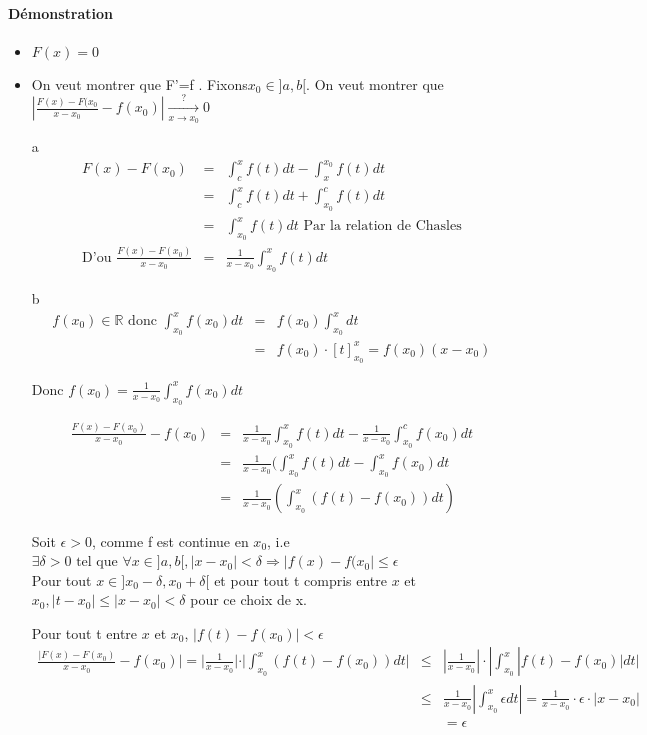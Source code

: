 \paragraph{Démonstration} 
\begin{itemize}
	\item $F(x) = 0$
	\item On veut montrer que F'=f . Fixons$x_0 \in ]a, b[$. On veut montrer que $|\frac{F(x) - F(x_0}{x-x_0} - f(x_0)| \xrightarrow[x \to x_0]{?} 0$ ~\\

	\item[a] \[\begin{array}{rclr}F(x) - F(x_0) &=& \int_c^x f(t)dt - \int_x^{x_0} f(t)dt \\
&=& \int_c^x f(t)dt + \int_{x_0}^c f(t)dt \\
&=& \int_{x_0}^x f(t)dt \text{ Par la relation de Chasles} \\
\text{D'ou } \frac{F(x)-F(x_0)}{x-x_0} &=& \frac{1}{x-x_0} \int_{x_0}^x f(t)dt \end{array}\]

	\item[b] \[\begin{array}{rcl}
				f(x_0) \in \mathbb{R} \text{ donc } \int_{x_0}^x f(x_0)dt &=& f(x_0)\int_{x_0}^x dt \\
&=& f(x_0)\cdot {[t]}^x_{x_0} = f(x_0)(x-x_0) \end{array}\]

	Donc $f(x_0) = \frac{1}{x-x_0}\int_{x_0}^x f(x_0)dt$

	\[\begin{array}{rcl}
			\frac{F(x)-F(x_0)}{x-x_0} - f(x_0) &=& \frac{1}{x-x_0}\int^x_{x_0}f(t)dt - \frac{1}{x-x_0} \int_{x_0}^c f(x_0)dt \\
											&=& \frac{1}{x-x_0} (\int_{x_0}^x f(t)dt - \int_{x_0}^x f(x_0)dt \\
								   &=& \frac{1}{x-x_0} (\int_{x_0}^x (f(t) - f(x_0))dt)\end{array}\]

		Soit $\epsilon > 0$, comme f est continue en $x_0$, i.e $\exists \delta > 0 \text{ tel que } \forall x \in ]a, b[, |x-x_0| < \delta \Rightarrow |f(x)-f(x_0| \leq \epsilon$ ~\\
		Pour tout $x \in ]x_0-\delta, x_0+\delta[$ et pour tout t compris entre $x$ et $x_0, |t-x_0| \leq |x-x_0| < \delta$ pour ce choix de x.

			Pour tout t entre $x$ et $x_0$, $|f(t)-f(x_0)| < \epsilon$ \[\begin{array}{rcl}
				\frac{|F(x)-F(x_0)}{x-x_0} - f(x_0)| = |\frac{1}{x-x_0}|\cdot |\int_{x_0}^x (f(t)-f(x_0))dt| &\leq& |\frac{1}{x-x_0}|\cdot |\int_{x_0}^x |f(t)-f(x_0)|dt| \\
																		  &\leq& \frac{1}{x-x_0}|\int_{x_0}^x \epsilon dt| = \frac{1}{x-x_0} \cdot \epsilon\cdot |x-x_0| \\
																										  &&= \epsilon \end{array}\]
\end{itemize}

